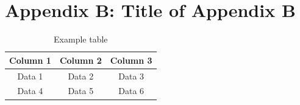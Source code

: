 \documentclass[11pt]{article}
\begin{document}
\newpage
\section{Appendix B: Title of Appendix B}
\label{appendix:b}

\begin{table}[H]
\centering
\begin{tabular}{|c|c|c|}
\hline
Column 1 & Column 2 & Column 3 \\ \hline
Data 1   & Data 2   & Data 3   \\ \hline
Data 4   & Data 5   & Data 6   \\ \hline
\end{tabular}
\caption{Example table}
\end{table}
   \centering
    
    
\end{document}
